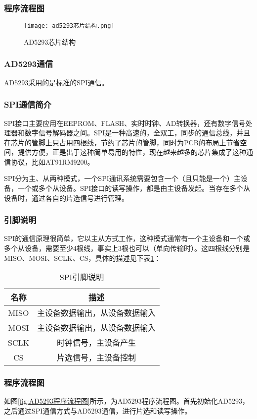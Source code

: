 \documentclass[lang=cn,11pt,a4paper]{elegantpaper}
\begin{document}
\subsubsection{程序流程图}
\begin{figure}[!htb]
  \centering
  \texttt{[image: ad5293芯片结构.png]}
  \caption{AD5293芯片结构}
  \label{fig:ad5293芯片结构}
\end{figure}

\subsubsection{AD5293通信}
AD5293采用的是标准的SPI通信。
\subsubsection{SPI通信简介}
SPI接口主要应用在EEPROM、FLASH、实时时钟、AD转换器，还有数字信号处理器和数字信号解码器之间。SPI是一种高速的，全双工，同步的通信总线，并且在芯片的管脚上只占用四根线，节约了芯片的管脚，同时为PCB的布局上节省空间，提供方便，正是出于这种简单易用的特性，现在越来越多的芯片集成了这种通信协议，比如AT91RM9200。

SPI分为主、从两种模式，一个SPI通讯系统需要包含一个（且只能是一个）主设备，一个或多个从设备。SPI接口的读写操作，都是由主设备发起。当存在多个从设备时，通过各自的片选信号进行管理。

\subsubsection{引脚说明}
SPI的通信原理很简单，它以主从方式工作，这种模式通常有一个主设备和一个或多个从设备，需要至少4根线，事实上3根也可以（单向传输时）。这四根线分别是MISO、MOSI、SCLK、CS，具体的描述见下表\ref{tab:SPI}：
\begin{table}[!ht]
  \centering
  \caption{SPI引脚说明}
  \begin{tabular}{cc}
    \textbf{名称} & \textbf{描述 }    \\ \hline
    MISO        & 主设备数据输出，从设备数据输入 \\
    MOSI        & 主设备数据输出，从设备数据输入 \\
    SCLK        & 时钟信号，主设备产生      \\
    CS          & 片选信号，主设备控制      \\
  \end{tabular}
  \label{tab:SPI}
\end{table}

\subsubsection{程序流程图}
如图\ref{fig:AD5293程序流程图}所示，为AD5293程序流程图。首先初始化AD5293，之后通过SPI通信方式与AD5293通信，进行片选和读写操作。
\end{document}
